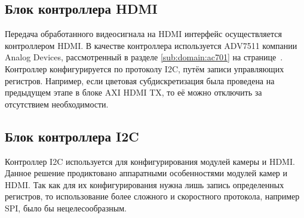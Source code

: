 
\subsection{Блок контроллера HDMI}
\label{sec:structural:hdmi_controller}
Передача обработанного видеосигнала на HDMI интерфейс осуществляется контроллером HDMI.
В качестве контроллера используется ADV7511 компании Analog Devices, рассмотренный в разделе
\ref{sub:domain:ac701} на странице~\pageref{fig:domain:ac701:hdmi}. Контроллер конфигурируется
по протоколу I2C, путём записи управляющих регистров. Например, если цветовая субдискретизация была
проведена на предыдущем этапе в блоке AXI HDMI TX, то её можно отключить за отсутствием необходимости.

\subsection{Блок контроллера I2C}
\label{sec:structural:i2c}
Контроллер I2C используется для конфигурирования модулей камеры и HDMI. Данное решение продиктовано
аппаратными особенностями модулей камер и HDMI. Так как для их конфигурирования нужна лишь запись определенных регистров,
то использование более сложного и скоростного протокола, например SPI, было бы нецелесообразным.
